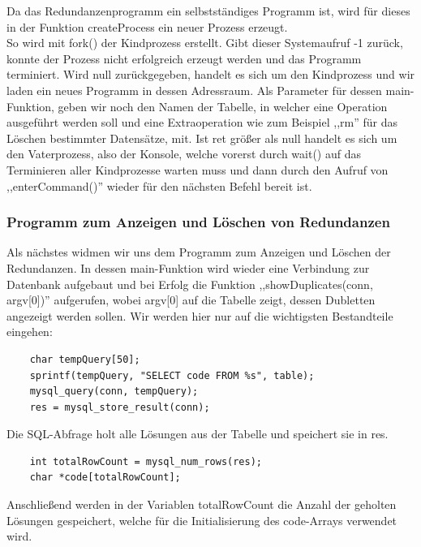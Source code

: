 \documentclass[12pt]{report}
\begin{document}
\noindent Da das Redundanzenprogramm ein selbstständiges Programm ist, wird für dieses in der Funktion createProcess ein neuer Prozess erzeugt.\\
So wird mit fork() der Kindprozess erstellt. Gibt dieser Systemaufruf -1 zurück, konnte der Prozess nicht erfolgreich erzeugt werden und das Programm terminiert. Wird null zurückgegeben, handelt es sich um den Kindprozess und wir laden ein neues Programm in dessen Adressraum. Als Parameter für dessen main-Funktion, geben wir noch den Namen der Tabelle, in welcher eine Operation ausgeführt werden soll und eine Extraoperation wie zum Beispiel ,,rm'' für das Löschen bestimmter Datensätze, mit. Ist ret größer als null handelt es sich um den Vaterprozess, also der Konsole, welche vorerst durch wait() auf das Terminieren aller Kindprozesse warten muss und dann durch den Aufruf von ,,enterCommand()'' wieder für den nächsten Befehl bereit ist.\\

\subsubsection{Programm zum Anzeigen und Löschen von Redundanzen}
Als nächstes widmen wir uns dem Programm zum Anzeigen und Löschen der Redundanzen. In dessen main-Funktion wird wieder eine Verbindung zur Datenbank aufgebaut und bei Erfolg die Funktion ,,showDuplicates(conn, argv[0])'' aufgerufen, wobei argv[0] auf die Tabelle zeigt, dessen Dubletten angezeigt werden sollen. Wir werden hier nur auf die wichtigsten Bestandteile eingehen:\\


\begin{lstlisting}
    char tempQuery[50];
    sprintf(tempQuery, "SELECT code FROM %s", table);
    mysql_query(conn, tempQuery);
    res = mysql_store_result(conn);
\end{lstlisting}

\noindent Die SQL-Abfrage holt alle Lösungen aus der Tabelle und speichert sie in res.\\

\begin{lstlisting}
    int totalRowCount = mysql_num_rows(res);
    char *code[totalRowCount];
\end{lstlisting}

\noindent Anschließend werden in der Variablen totalRowCount die Anzahl der geholten Lösungen gespeichert, welche für die Initialisierung des code-Arrays verwendet wird.\\
\end{document}
